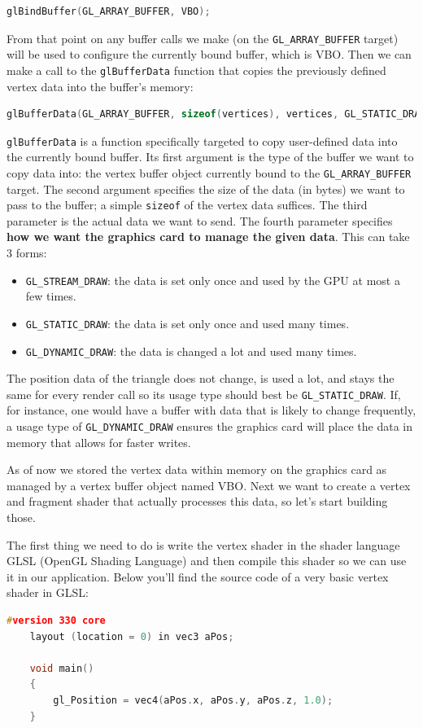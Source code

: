 \begin{lstlisting}[language=C++]
    glBindBuffer(GL_ARRAY_BUFFER, VBO);
\end{lstlisting}

From that point on any buffer calls we make (on the \verb|GL_ARRAY_BUFFER| target) will be used to configure the currently bound buffer, which is VBO. Then we can make a call to the \verb|glBufferData| function that copies the previously defined vertex data into the buffer's memory:

\begin{lstlisting}[language=C++]
    glBufferData(GL_ARRAY_BUFFER, sizeof(vertices), vertices, GL_STATIC_DRAW);
\end{lstlisting}

\verb|glBufferData| is a function specifically targeted to copy user-defined data into the currently bound buffer. Its first argument is the type of the buffer we want to copy data into: the vertex buffer object currently bound to the \verb|GL_ARRAY_BUFFER| target. The second argument specifies the size of the data (in bytes) we want to pass to the buffer; a simple \verb|sizeof| of the vertex data suffices. The third parameter is the actual data we want to send.
The fourth parameter specifies \textbf{how we want the graphics card to manage the given data}. This can take 3 forms:

\begin{itemize}
    \item \verb|GL_STREAM_DRAW|: the data is set only once and used by the GPU at most a few times.
    \item \verb|GL_STATIC_DRAW|: the data is set only once and used many times.
    \item \verb|GL_DYNAMIC_DRAW|: the data is changed a lot and used many times.
\end{itemize}

The position data of the triangle does not change, is used a lot, and stays the same for every render call so its usage type should best be \verb|GL_STATIC_DRAW|. If, for instance, one would have a buffer with data that is likely to change frequently, a usage type of \verb|GL_DYNAMIC_DRAW| ensures the graphics card will place the data in memory that allows for faster writes.

As of now we stored the vertex data within memory on the graphics card as managed by a vertex buffer object named VBO. Next we want to create a vertex and fragment shader that actually processes this data, so let's start building those.

The first thing we need to do is write the vertex shader in the shader language GLSL (OpenGL Shading Language) and then compile this shader so we can use it in our application. Below you'll find the source code of a very basic vertex shader in GLSL:

\begin{lstlisting}[language=C++]
    #version 330 core
    layout (location = 0) in vec3 aPos;

    void main()
    {
        gl_Position = vec4(aPos.x, aPos.y, aPos.z, 1.0);
    }
\end{lstlisting}